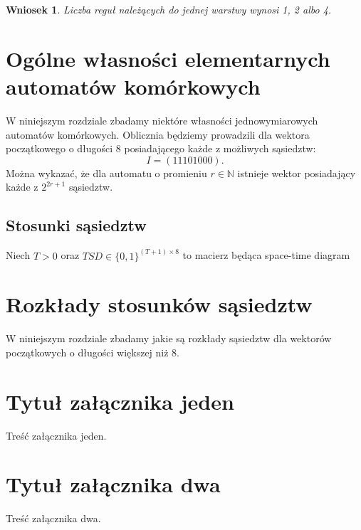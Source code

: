 \documentclass{xmgr}
\newtheorem{corollary}{Wniosek}
\begin{document}
\begin{corollary}
 Liczba reguł należących do jednej warstwy wynosi 1, 2 albo 4.
\end{corollary}

\chapter{Ogólne własności elementarnych automatów komórkowych}
W niniejszym rozdziale zbadamy niektóre własności jednowymiarowych automatów komórkowych. Oblicznia będziemy prowadzili dla wektora 
początkowego o długości 8 posiadającego każde z możliwych sąsiedztw:
\[
 I = (11101000).
\]
Można wykazać, że dla automatu o promieniu $r\in\mathbb{N}$ istnieje wektor posiadający każde z $2^{2r+1}$ sąsiedztw.
\section{Stosunki sąsiedztw}
Niech $T > 0$ oraz $TSD \in \{0,1\}^{(T+1)\times8}$ to macierz będąca space-time diagram 

\chapter{Rozkłady stosunków sąsiedztw}
W niniejszym rozdziale zbadamy jakie są rozkłady sąsiedztw dla wektorów początkowych o długości większej niż 8.
\summary

\appendix
\chapter{Tytuł załącznika jeden}

Treść załącznika jeden.

\chapter{Tytuł załącznika dwa}

Treść załącznika dwa.




\listoftables

\listoffigures

\oswiadczenie
\end{document}
